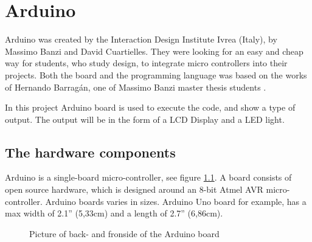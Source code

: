 \chapter{Arduino}\label{analysis:arduino}
Arduino was created by the Interaction Design Institute Ivrea (Italy), by Massimo Banzi and David Cuartielles. They were looking for an easy and cheap way for students, who study design, to integrate micro controllers into their projects\cite{arduino:hist}. Both the board and the programming language was based on the works of Hernando Barragán, one of Massimo Banzi master thesis students \cite{Wiring:thesis}.

In this project Arduino board is used to execute the code, and show a type of output. The output will be in the form of a LCD Display and a LED light. 

\section{The hardware components}
Arduino is a single-board micro-controller, see figure \ref{fig:Arduino}.
A board consists of open source hardware, which is designed around an 8-bit Atmel AVR micro-controller. Arduino boards varies in sizes. Arduino Uno board for example, has a max width of 2.1'' (5,33cm) and a length of 2.7'' (6,86cm).  \\

\par
{}
\hfill
{}
\begin{figure}[H]
\caption{Picture of back- and fronside of the Arduino board \cite{Arduino_board_pics}}
\label{fig:Arduino}
\end{figure}
\par

